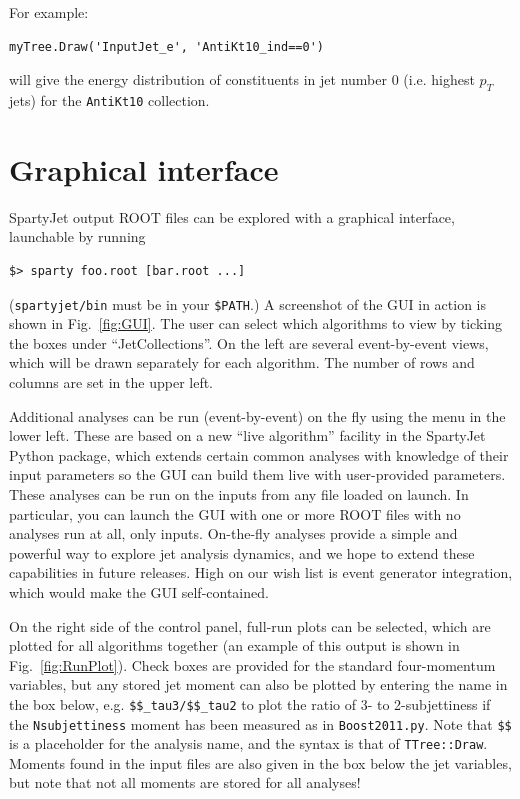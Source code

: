 \documentclass{article}
\newcommand{\prog}[1]{{\sc #1}\xspace}
\newcommand{\code}[1]{{\tt #1}\xspace}
\newcommand{\SJ}[0]{\prog{SpartyJet}}
\begin{document}
For example:
\begin{lstlisting}
myTree.Draw('InputJet_e', 'AntiKt10_ind==0')
\end{lstlisting}
will give the energy distribution of constituents in jet number 0 (i.e. highest $p_T$ jets) for the \code{AntiKt10} collection.


\section{Graphical interface}
\label{f0:GUI}

\SJ output \prog{ROOT} files can be explored with a graphical interface, launchable by running
\begin{lstlisting}
$> sparty foo.root [bar.root ...]
\end{lstlisting}
(\verb+spartyjet/bin+ must be in your \verb+$PATH+.)  A screenshot of the GUI in action is shown in Fig.~\ref{fig:GUI}.  The user can select which algorithms to view by ticking the boxes under ``JetCollections''.  On the left are several event-by-event views, which will be drawn separately for each algorithm.  The number of rows and columns are set in the upper left.

Additional analyses can be run (event-by-event) on the fly using the menu in the lower left.  These are based on a new ``live algorithm'' facility in the \SJ Python package, which extends certain common analyses with knowledge of their input parameters so the GUI can build them live with user-provided parameters.  These analyses can be run on the inputs from any file loaded on launch.  In particular, you can launch the GUI with one or more \prog{ROOT} files with no analyses run at all, only inputs.  On-the-fly analyses provide a simple and powerful way to explore jet analysis dynamics, and we hope to extend these capabilities in future releases.  High on our wish list is event generator integration, which would make the GUI self-contained.

On the right side of the control panel, full-run plots can be selected, which are plotted for all algorithms together (an example of this output is shown in Fig.~\ref{fig:RunPlot}).  Check boxes are provided for the standard four-momentum variables, but any stored jet moment can also be plotted by entering the name in the box below, e.g. \verb+$$_tau3/$$_tau2+ to plot the ratio of 3- to 2-subjettiness if the \code{Nsubjettiness} moment has been measured as in \verb+Boost2011.py+.  Note that \verb+$$+ is a placeholder for the analysis name, and the syntax is that of \code{TTree::Draw}.  Moments found in the input files are also given in the box below the jet variables, but note that not all moments are stored for all analyses!
\end{document}
